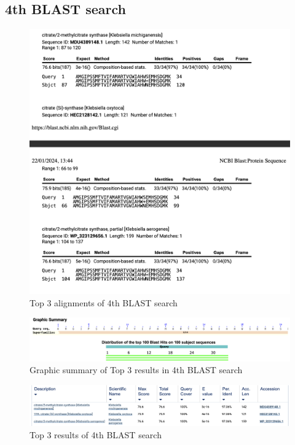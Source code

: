 \documentclass[a4paper,english,12pt,bibliography=totoc]{scrreprt}
\begin{document}
\subsection{4th BLAST search}

\begin{figure}[H]
    \centering
    \includegraphics[width=0.9\linewidth]{Project 1/4th images/alignments 4.png}
    \caption{Top 3 alignments of 4th BLAST search}
    \label{fig:enter-label}
\end{figure}


\begin{figure}[H]
    \centering
    \includegraphics[width=0.9\linewidth]{Project 1/4th images/graphic summary 4.png}
    \caption{Graphic summary of Top 3 results in 4th BLAST search}
\end{figure}


\begin{figure}[H]
    \centering
    \includegraphics[width=0.9\linewidth]{Project 1/4th images/Blast results 4.png}
    \caption{Top 3 results of 4th BLAST search}
    \label{fig:enter-label}
\end{figure}
\end{document}

